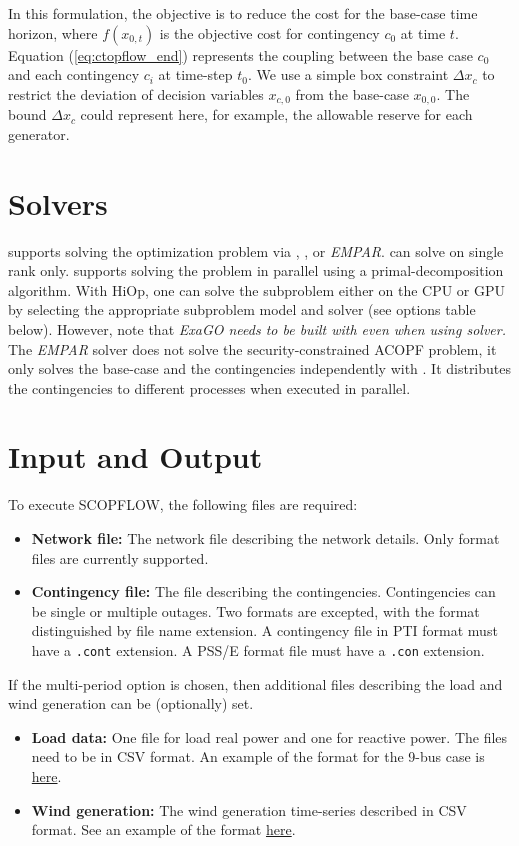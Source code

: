 In this formulation, the objective is to reduce the cost for the base-case time
horizon, where $f(x_{0,t})$ is the objective cost for contingency $c_0$ at time
$t$. Equation (\ref{eq:ctopflow_end}) represents the coupling between the base
case $c_0$ and each contingency $c_i$ at time-step $t_0$. We use a simple box
constraint $\Delta x_c$ to restrict the  deviation of decision variables
$x_{c,0}$ from the base-case $x_{0,0}$. The bound $\Delta x_c$ could represent here, for example, the allowable reserve for each generator.

\section{Solvers}
\scopflow supports solving the optimization problem via \ipopt, \hiop, or \emph{EMPAR}. \ipopt can solve \scopflow on single rank only. \hiop supports solving the problem in parallel using a primal-decomposition algorithm. With HiOp, one can solve the subproblem either on the CPU or GPU by selecting the appropriate subproblem model and solver (see options table below).  However, note that \emph{ExaGO needs to be built with \ipopt even when using \hiop solver.} The \emph{EMPAR} solver does not solve the security-constrained ACOPF problem, it only solves the base-case and the contingencies independently with \opflow. It distributes the contingencies to different processes when executed in parallel.

\section{Input and Output}
To execute SCOPFLOW, the following files are required:
\begin{itemize}
    \item \textbf{Network file:} The network file describing the network details. Only \matpower format files are currently supported.
    \item \textbf{Contingency file:} The file describing the
      contingencies. Contingencies can be single or multiple
      outages. Two formats are excepted, with the format distinguished
      by file name extension.  A contingency file in PTI format must
      have a \texttt{.cont} extension.  A PSS/E format file must have
      a \texttt{.con} extension.
\end{itemize}
If the multi-period option is chosen, then additional files describing the load and wind generation can be (optionally) set.
\begin{itemize}
    \item \textbf{Load data:} One file for load real power and one for reactive power. The files need to be in CSV format. An example of the format for the 9-bus case is \href{https://gitlab.pnnl.gov/exasgd/frameworks/exago/-/tree/master/datafiles/case9}{here}.
    \item \textbf{Wind generation:} The wind generation time-series described in CSV format. See an example of the format \href{https://gitlab.pnnl.gov/exasgd/frameworks/exago/-/tree/master/datafiles/case9}{here}.
\end{itemize}

